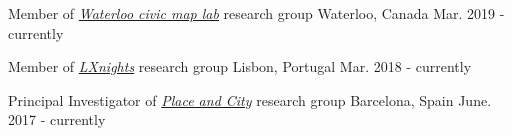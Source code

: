 
\begin{cventries}

    \cventry
    {} %
    {Member of \href{https://uwaterloo.ca/civic-map-lab/}{\textit{Waterloo civic map lab}} research group} %
    {Waterloo, Canada} %
    {Mar. 2019 - currently} %
    {    }
    
\vspace{-4mm}

  \cventry
    {} %
    {Member of \href{https://lxnights.hypotheses.org}{\textit{LXnights}} research group} %
    {Lisbon, Portugal} %
    {Mar. 2018 - currently} %
    {    }

\vspace{-4mm}

  \cventry
    {} %
    {Principal Investigator of \href{https://blog.placeandcity.com}{\textit{Place and City}} research group} %
    {Barcelona, Spain} %
    {June. 2017 - currently} %
    {    }

\vspace{-4mm}
\end{cventries}

\vspace{-7mm}